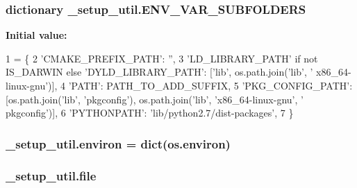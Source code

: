 \subsubsection[{\texorpdfstring{E\+N\+V\+\_\+\+V\+A\+R\+\_\+\+S\+U\+B\+F\+O\+L\+D\+E\+RS}{ENV_VAR_SUBFOLDERS}}]{\setlength{\rightskip}{0pt plus 5cm}dictionary \+\_\+setup\+\_\+util.\+E\+N\+V\+\_\+\+V\+A\+R\+\_\+\+S\+U\+B\+F\+O\+L\+D\+E\+RS}\hypertarget{namespace__setup__util_aa31804f1be8660156ce9394b33c68dc4}{}\label{namespace__setup__util_aa31804f1be8660156ce9394b33c68dc4}
{\bfseries Initial value\+:}
\begin{DoxyCode}
1 = \{
2     \textcolor{stringliteral}{'CMAKE\_PREFIX\_PATH'}: \textcolor{stringliteral}{''},
3     \textcolor{stringliteral}{'LD\_LIBRARY\_PATH'} \textcolor{keywordflow}{if} \textcolor{keywordflow}{not} IS\_DARWIN \textcolor{keywordflow}{else} \textcolor{stringliteral}{'DYLD\_LIBRARY\_PATH'}: [\textcolor{stringliteral}{'lib'}, os.path.join(\textcolor{stringliteral}{'lib'}, \textcolor{stringliteral}{'
      x86\_64-linux-gnu'})],
4     \textcolor{stringliteral}{'PATH'}: PATH\_TO\_ADD\_SUFFIX,
5     \textcolor{stringliteral}{'PKG\_CONFIG\_PATH'}: [os.path.join(\textcolor{stringliteral}{'lib'}, \textcolor{stringliteral}{'pkgconfig'}), os.path.join(\textcolor{stringliteral}{'lib'}, \textcolor{stringliteral}{'x86\_64-linux-gnu'}, \textcolor{stringliteral}{'
      pkgconfig'})],
6     \textcolor{stringliteral}{'PYTHONPATH'}: \textcolor{stringliteral}{'lib/python2.7/dist-packages'},
7 \}
\end{DoxyCode}
\subsubsection[{\texorpdfstring{environ}{environ}}]{\setlength{\rightskip}{0pt plus 5cm}\+\_\+setup\+\_\+util.\+environ = dict(os.\+environ)}\hypertarget{namespace__setup__util_a9a935bdd9ee1aa0327161025bb18c136}{}\label{namespace__setup__util_a9a935bdd9ee1aa0327161025bb18c136}
\subsubsection[{\texorpdfstring{file}{file}}]{\setlength{\rightskip}{0pt plus 5cm}\+\_\+setup\+\_\+util.\+file}\hypertarget{namespace__setup__util_aea63a1b32cc79bc3d872ab7cb30dd07e}{}\label{namespace__setup__util_aea63a1b32cc79bc3d872ab7cb30dd07e}
